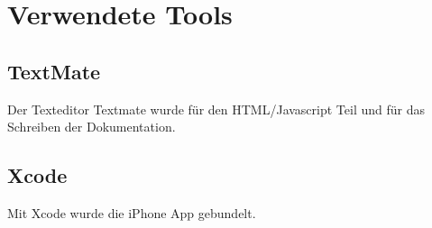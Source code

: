 
\newpage
\section{Verwendete Tools} %
\label{sec:Verwendete Tools}

\subsection{TextMate} %
\label{sub:TextMate}
Der Texteditor Textmate wurde für den HTML/Javascript Teil und für das Schreiben der Dokumentation.

\subsection{Xcode} %
\label{ssub:Xcode}
Mit Xcode wurde die iPhone App gebundelt.
